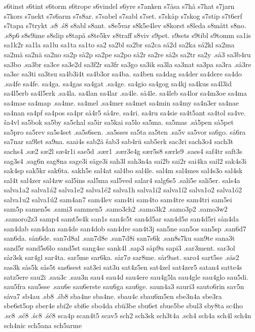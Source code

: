 {{s6tinst
s6tint
s6torm
s6trope
s6vindel
s6yre
s7anken
s7åsa
s7hå
s7hat
s7jarn
s7kors
s7nekt
s7s6arm
s7s8ar.
s7sabel
s7sabl
s7set.
s7skåp
s7skog
s7stip
s7t6erf
s7tapa
s7trykt
.s8
.ś8
s8abl
s8ant.
s8e5var
s8k5e4lev
s8korst
s8leda
s8mått
s8no.
.s8p6
s8s9ime
s8slip
s8tapå
s8te5kv
s8traff
s8viv
s9pet.
s9sets
s9tibl
s9tomm
sa1is
sa1k2r
sa1la
sa1lu
sa1ta
sa1to
sa2
sa2bl
sa2br
sa2ca
sá2d
sa2ka
sá2kl
sa2ma
sa2mä
sa2nä
sa2no
sa2p
så2p
sa2pe
sa2po
så2r
sa2re
så2s
sa2tr
sa2y
.så3
sa3b4ru
sa3bo
.sa3br
sa3ce
sa3e2d
sa3f2r
sa3fr
sa3go
sa3ik
sa3la
sa3nat
sa3pa
sa3ra
.så3re
sa3sc
sa3ti
sa3tsu
sa4b3i4t
sa4b3or
sa4ba.
sa4ben
sa4dag
sa4der
sa4dere
sa4do
.sa4fe
sa4fe.
sa4ga.
sa4gas
sa4gat
.sa4ge.
sa4gio
sa4gog
sa4kj
sa4kus
sa4l3id
sa4l5erb
sa4l5erk
.sa4la.
sa4lan
sa4lar
.sa4le.
så4le.
sa4leb
sa4lor
sa4m3oe
sa4ma
sa4mae
sa4map
.sa4me.
sa4mel
.sa4mer
sa4met
sa4min
sa4my
sa4n3er
sa4nae
sa4nan
sa4pf
sa4pos
sa4pr
så4r5
så4re.
sa4ri.
sa4ru
sa4sie
sa4t5ant
sa4tol
sa4ve.
ša4vl
sa5bok
sa5by
sa5chal
sa5ir
sa5kai
sa5lo
sa5ma.
sa5mas
.så5pen
så5pet
sa5pro
sa5rev
sa5s4set
.sa5s6sen.
.sa5sses
sa5ta
sa5ten
.sa5v
sa5vor
sa6go.
så6ra
sa7nar
sa9let
sa9na.
saai4s
sab2ä
šab3
sab4rü
sab5erk
sac3ri
sach3o4
sach3t
sachs4
.sæ2
sæ2l
sæ4r1i
sae5d
.sær1
.sær3e4g
sær5s8
særle9
.saes4
saf4tr
saft3s
sag3s4
.sag6n
sag8na
sage3i
säge3i
sah3l
sah3n4a
sai2b
sai2r
sai4ka
sail2
sak4s3i
sak4sp
sak5kr
sak6ta.
sakh5e
sal4at
sal4bo
sal4le.
sal4m
sal4mes
sal4s3o
sal4sk
sal4t
sal4zer
sal4zw
sal5ins
sal5ma
sal5ved
salar4
salg6s5
.sali5e
sali5er.
sals4a
salva1a2
salva1á2
salva1e2
salva1é2
salva1h
salva1i2
salva1í2
salva1o2
salva1ó2
salva1u2
salva1ú2
sam4an7
sam4lev
sam4ti
sam4to
sam4tre
sam4tri
sam5ei
sam5p
samen5s
.sami3
sammen5
.samo3ch2
.samo3k2
.samo3p2
.samo3w2
.samoro2z3
samp4
samt5s4k
san1s
san4c5t
san4d5ar
san4d5ø
san4d5ri
sån4da
san4dab
san4dan
san4de
san4dob
san4dre
san4t3j
san5ne
san5os
san5sp
.san6d7
san6da.
sån6de.
san7d8al
.san7d8e
.san7d8i
san7s6k
.san8s7ku
san9te
sana3t
sand5r
sand5s6lo
sand5st
sang4sc
sank4l
.sap3
såp9u
sapi3
.sar3ment.
sar3ol
sår3sk
sar4gl
sar4ta.
sar5me
sar6ka.
sår7ø
sar8me.
sår9ast.
saro4
sart5se
.säs2
sas3k
sås5k
sås5t
sas6sest
sat3ei
sat3u
sat4z5en
sat4zel
sat4zer5
satan4
satte4s
satz5ere
sau2i
.sau3c
.sau3n
sau4
sau4d
sau4ere
sau4g5la
sau4gle
sau4glo
sau5di.
sau5fra
sau5sse
.sau6e
sau6erste
sau6ga
sau6ge.
saun4a3
sauri3
sauto6rin
sav5n
såva7
sb4au
.sb8
.śb8
sba4ne
sba4ne.
sbau4c
sbau6m5en
sbe3n4a
sbe3ra
sbe6st5op
sber4e
sbi2e
sbi6e
sbo4da
sbü3be
sbu6et
sbue5be
sbul3
sby8ta
sc4ho
.sc8
.sć8
.śc8
.ść8
sca4p
scan4t5
scav5
sch2
sch3sk
sch3t4a
.sch4
sch4a
sch4l
sch4n
sch4nic
sch5ana
sch5arme
}}

